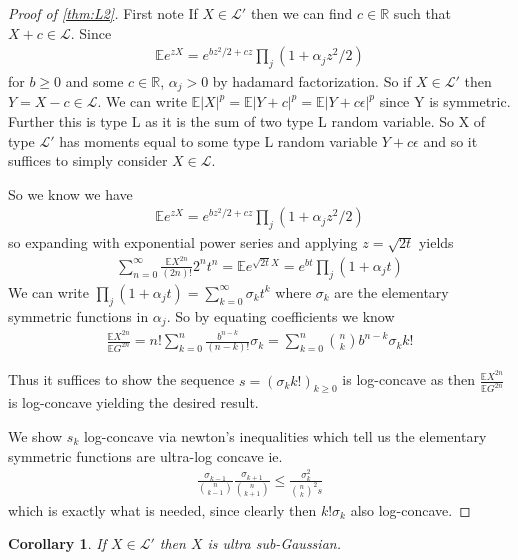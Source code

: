 \documentclass[10pt]{article}
\newcommand{\E}{\mathbb{E}}
\newcommand{\1}{\textbf{1}}
\newcommand{\R}{\mathbb{R}}
\newtheorem{corollary}{Corollary}[subsection]
\theoremstyle{remark}
\theoremstyle{definition}
\begin{document}
\begin{proof}[Proof of \ref{thm:L2}]
	First note If $X \in \mathcal{L}'$ then we can find $c \in \R$ such that $X+c \in \mathcal{L}$. Since
	\begin{align*}
		\E e^{zX} = e^{bz^2/2+cz}\prod_j(1+\alpha_jz^2/2)
	\end{align*}
	for $b \geq 0$ and some $c \in \R$, $\alpha_j > 0$ by hadamard factorization. So if $X \in \mathcal{L}'$ then $Y = X-c \in \mathcal{L}$. We can write $\E|X|^p = \E|Y+c|^p = \E|Y+c\epsilon|^p$ since Y is symmetric. Further this is type L as it is the sum of two type L random variable. So X of type $\mathcal{L}'$ has moments equal to some type L random variable $Y+c\epsilon$ and so it suffices to simply consider $X \in \mathcal{L}$.

	So we know we have
	\begin{align*}
		\E e^{zX} = e^{bz^2/2+cz}\prod_j(1+\alpha_jz^2/2)
	\end{align*}
	so expanding with exponential power series and applying $z = \sqrt{2t}$ yields
	\begin{align*}
		\sum_{n=0}^{\infty}\frac{\E X^{2n}}{(2n)!} 2^nt^n = \E e^{\sqrt{2t}X} = e^{bt}\prod_j(1+\alpha_j t)
	\end{align*}
	We can write $\prod_j(1+\alpha_j t) = \sum_{k=0}^{\infty}\sigma_k t^k$ where $\sigma_k$ are the elementary symmetric functions in $\alpha_j$. So by equating coefficients we know 
	\begin{align*}
		\frac{\E X^{2n}}{\E G^{2n}} = n!\sum_{k=0}^n \frac{b^{n-k}}{(n-k)!}\sigma_k = \sum_{k=0}^n {n \choose k}b^{n-k}\sigma_k k!
	\end{align*}

	Thus it suffices to show the sequence $s = (\sigma_k k!)_{k \geq 0}$ is log-concave as then $\frac{\E X^{2n}}{\E G^{2n}}$ is log-concave yielding the desired result. 

	We show $s_k$ log-concave via newton's inequalities which tell us the elementary symmetric functions are ultra-log concave ie.
	\begin{align*}
		\frac{\sigma_{k-1}}{{n \choose k-1}}\frac{\sigma_{k+1}}{{n \choose k+1}} \leq \frac{\sigma_{k}^2}{{n \choose k}^2s}
	\end{align*}
	which is exactly what is needed, since clearly then $k!\sigma_k$ also log-concave.
\end{proof}

\begin{corollary}
	If $X \in \mathcal{L}'$ then $X$ is ultra sub-Gaussian. 
\end{corollary}
\end{document}
